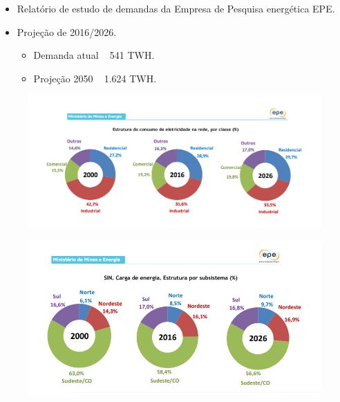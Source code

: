 \begin{frame}
  \begin{block}{}
   \begin{itemize}
     \item Relatório de estudo de demandas da Empresa de Pesquisa energética EPE.
     \item Projeção de 2016/2026.
       \begin{itemize}
         \item Demanda atual ~ 541 TWH.
         \item Projeção 2050 ~ 1.624 TWH.
       \end{itemize}
   \end{itemize}
  \end{block}
  \begin{figure}[h]
  	\begin{center}
      \includegraphics [scale=0.2]{./Figures/t02}
  	\end{center}
  \end{figure}
  \begin{figure}[h]
  	\begin{center}
      \includegraphics [scale=0.2]{./Figures/t03}
  	\end{center}
  \end{figure}
\end{frame}

